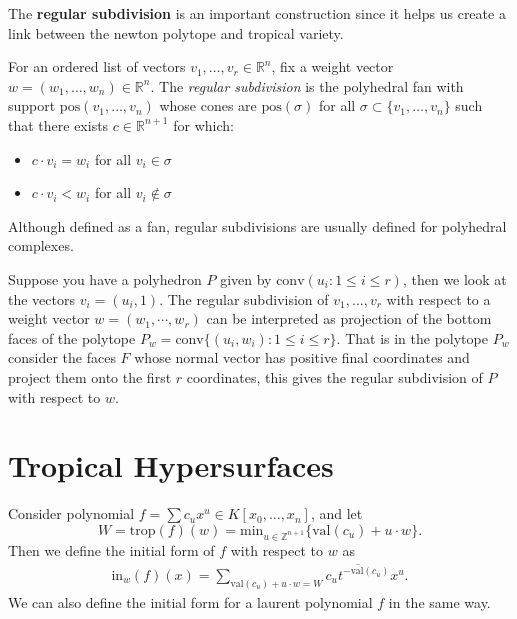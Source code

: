     The \textbf{regular subdivision} is an important construction since it helps us create a link between the newton polytope and tropical variety. 
    \begin{definition}
    For an ordered list of vectors $v_1,\dots, v_r \in \mathbb{R}^{n}$, fix a weight vector $w = (w_1,\dots,w_n) \in \mathbb{R}^{n}$. 
    The \textit{regular subdivision} is the polyhedral fan with support $\text{pos}(v_1,\dots,v_n)$ whose cones are $\text{pos}(\sigma)$ for all $\sigma \subset \{v_1,\dots,v_n\}$ such that there exists $c \in \mathbb{R}^{n+1}$ for which:
    \begin{itemize}
        \item $c \cdot v_i = w_i$ for all $v_{i}\in \sigma$ 
        \item $c \cdot v_i < w_i$ for all $v_i \not\in \sigma$
    \end{itemize}
    Although defined as a fan, regular subdivisions are usually defined for polyhedral complexes.
    \end{definition}
    Suppose you have a polyhedron $P$ given by $\text{conv}(u_i: 1\leq i\leq r)$, then we look at the vectors $v_i = (u_i,1)$. The regular subdivision of $v_1,\dots,v_r$ with respect to a weight vector $w = (w_1, \cdots, w_r)$ can be interpreted as projection of the bottom faces of the polytope $P_w = \text{conv}\{(u_i,w_i): 1\leq i\leq r\}$. That is in the polytope $P_w$ consider the faces $F$ whose normal vector has positive final coordinates and project them onto the first $r$ coordinates, this gives the regular subdivision of $P$ with respect to $w$.


\section{Tropical Hypersurfaces}

    \begin{definition}
        Consider polynomial $f = \sum c_u x^u \in K[x_0,\dots,x_n]$, and let
        \[
            W = \text{trop}(f)(w) = \text{min}_{u \in \mathbb{Z}^{n+1}}\{\text{val}(c_u) + u\cdot w\}.
        \]
        Then we define the initial form of $f$ with respect to $w$ as
        \begin{align*}
            \text{in}_{w}(f)(x) = \sum_{\text{val}(c_u) + u\cdot w = W} \overline{c_u t^{-\text{val}(c_u)}} x^u.
        \end{align*}
        We can also define the initial form for a laurent polynomial $f$ in the same way.
    \end{definition}

